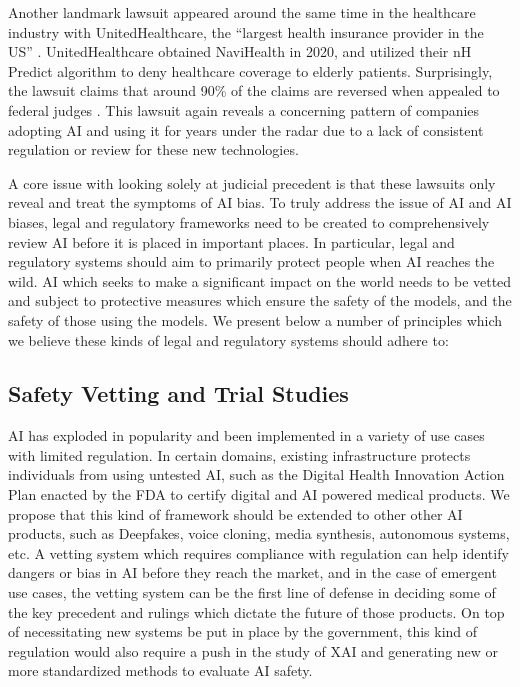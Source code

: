 \documentclass[10pt]{article}
\begin{document}
  Another landmark lawsuit appeared around the same time in the healthcare industry with UnitedHealthcare, the “largest health insurance provider in the US” \cite{laney2023ai}. UnitedHealthcare obtained NaviHealth in 2020, and utilized their nH Predict algorithm to deny healthcare coverage to elderly patients. Surprisingly, the lawsuit claims that around 90\% of the claims are reversed when appealed to federal judges \cite{laney2023ai}. This lawsuit again reveals a concerning pattern of companies adopting AI and using it for years under the radar due to a lack of consistent regulation or review for these new technologies.

  A core issue with looking solely at judicial precedent is that these lawsuits only reveal and treat the symptoms of AI bias. To truly address the issue of AI and AI biases, legal and regulatory frameworks need to be created to comprehensively review AI before it is placed in important places. In particular, legal and regulatory systems should aim to primarily protect people when AI reaches the wild. AI which seeks to make a significant impact on the world needs to be vetted and subject to protective measures which ensure the safety of the models, and the safety of those using the models. We present below a number of principles which we believe these kinds of legal and regulatory systems should adhere to:

  \subsection{Safety Vetting and Trial Studies}

    AI has exploded in popularity and been implemented in a variety of use cases with limited regulation. In certain domains, existing infrastructure protects individuals from using untested AI, such as the Digital Health Innovation Action Plan enacted by the FDA to certify digital and AI powered medical products. We propose that this kind of framework should be extended to other other AI products, such as Deepfakes, voice cloning, media synthesis, autonomous systems, etc. A vetting system which requires compliance with regulation can help identify dangers or bias in AI before they reach the market, and in the case of emergent use cases, the vetting system can be the first line of defense in deciding some of the key precedent and rulings which dictate the future of those products. On top of necessitating new systems be put in place by the government, this kind of regulation would also require a push in the study of XAI and generating new or more standardized methods to evaluate AI safety.
\end{document}
